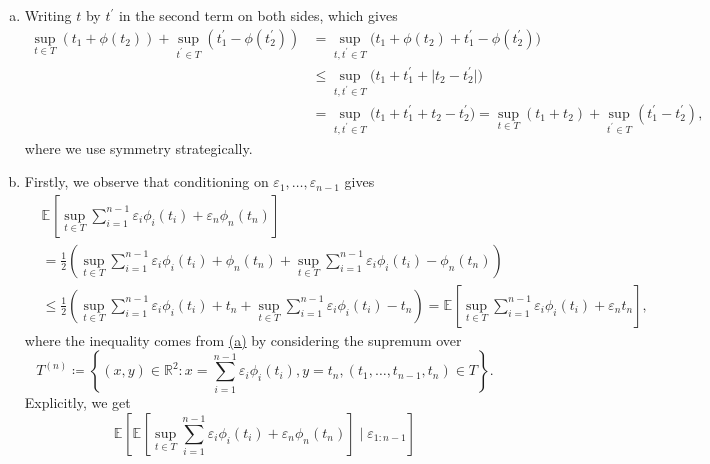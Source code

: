 \begin{answer}
	\begin{enumerate}[(a)]
		\item Writing \(t\) by \(t^{\prime} \) in the second term on both sides, which gives
		      \[
			      \begin{split}
				      \sup _{t \in T} (t_1 + \phi (t_2)) + \sup _{t^{\prime} \in T} (t^{\prime} _1 - \phi (t^{\prime} _2))
				       & = \sup _{t, t^{\prime} \in T} \big(t_1 + \phi (t_2) + t^{\prime} _1 - \phi (t^{\prime} _2) \big)    \\
				       & \leq \sup _{t, t^{\prime} \in T} \big(t_1 + t^{\prime} _1 + \lvert t_2 - t^{\prime} _2 \rvert \big) \\
				       & = \sup _{t, t^{\prime} \in T} \big(t_1 + t^{\prime} _1 + t_2 - t^{\prime} _2 \big)
				      = \sup _{t \in T} (t_1 + t_2) + \sup _{t^{\prime} \in T} (t^{\prime} _1 - t^{\prime} _2) ,
			      \end{split}
		      \]
		      where we use symmetry strategically.
		\item Firstly, we observe that conditioning on \(\varepsilon _1, \dots , \varepsilon _{n-1}\) gives
		      \[
			      \begin{split}
				       & \mathbb{E}_{}\left[\sup _{t \in T} \sum_{i=1}^{n-1} \varepsilon _i \phi _i(t_i) + \varepsilon _n \phi _n(t_n)\right]                                                                   \\
				       & = \frac{1}{2} \left( \sup _{t \in T} \sum_{i=1}^{n-1} \varepsilon _i \phi _i(t_i) + \phi _n(t_n) + \sup _{t \in T} \sum_{i=1}^{n-1} \varepsilon _i \phi _i(t_i) - \phi _n(t_n) \right) \\
				       & \leq \frac{1}{2} \left( \sup _{t \in T} \sum_{i=1}^{n-1} \varepsilon _i \phi _i(t_i) + t_n + \sup _{t \in T} \sum_{i=1}^{n-1} \varepsilon _i \phi _i(t_i) - t_n \right)
				      = \mathbb{E}_{}\left[\sup _{t \in T} \sum_{i=1}^{n-1} \varepsilon _i \phi _i(t_i) + \varepsilon _n t_n\right],
			      \end{split}
		      \]
		      where the inequality comes from \hyperref[ex6.7.7:a]{(a)} by considering the supremum over
		      \[
			      T^{(n)}
			      \coloneqq \left\{ (x, y) \in \mathbb{R} ^2 \colon x = \sum_{i=1}^{n-1} \varepsilon _i \phi _i(t_i), y = t_n, (t _1, \dots , t_{n-1}, t_n) \in T \right\}.
		      \]
		      Explicitly, we get
		      \[
			      \mathbb{E}_{}\left[ \mathbb{E}_{}\left[\sup _{t \in T} \sum_{i=1}^{n-1} \varepsilon _i \phi _i(t_i) + \varepsilon _n \phi _n(t_n)\right] \mid \varepsilon _{1 \colon n-1} \right]
\]
\end{enumerate}
\end{answer}
